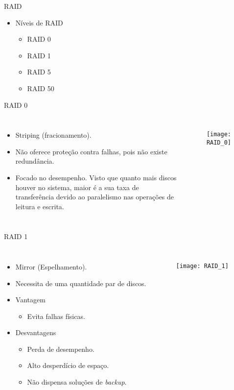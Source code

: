 \begin{frame}{RAID}
	\begin{itemize}
		\item Níveis de RAID
		\begin{itemize}
			\item RAID 0
			\item RAID 1
			\item RAID 5
			\item RAID 50
		\end{itemize}
	\end{itemize}
\end{frame}

\begin{frame}{RAID 0}
	\begin{columns}
		\begin{itemize}
			\item Striping (fracionamento).
			\item Não oferece proteção contra falhas, pois não existe redundância.
			\item Focado no desempenho. Visto que quanto mais discos houver no sistema, maior é a sua taxa de transferência devido ao paralelismo nas operações de leitura e escrita.
		\end{itemize}
		
		\begin{figure}
			\texttt{[image: RAID\_0]}
			\label{fig:exemplo}
		\end{figure}
		
	\end{columns}
\end{frame}

\begin{frame}{RAID 1}
	\begin{columns}
		\column{0.5\textwidth}
		\begin{itemize}
			\item Mirror (Espelhamento).
			\item Necessita de uma quantidade par de discos.
			\item Vantagem
			\begin{itemize}
				\item Evita falhas físicas.
			\end{itemize}
			\item Desvantagens
			\begin{itemize}
				\item Perda de desempenho.
				\item Alto desperdício de espaço.
				\item  Não dispensa soluções de \textit{backup}.
			\end{itemize}
		\end{itemize}
		
		\column{0.25\textwidth}
		\begin{figure}
			\texttt{[image: RAID\_1]}
			\label{fig:exemplo}
		\end{figure}
		
	\end{columns}
\end{frame}


